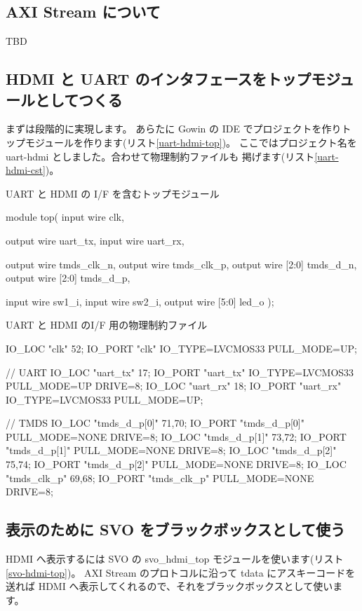 \subsection{AXI Stream について}
TBD

\subsection{HDMI と UART のインタフェースをトップモジュールとしてつくる}
まずは段階的に実現します。
あらたに Gowin の IDE でプロジェクトを作りトップモジュールを作ります(リスト\ref{uart-hdmi-top})。
ここではプロジェクト名を uart-hdmi としました。合わせて物理制約ファイルも
掲げます(リスト\ref{uart-hdmi-cst})。

\begin{table}
\label{uart-hdmi-top}
\caption{UART と HDMI の I/F を含むトップモジュール}
\begin{C++}
module top(
    input wire clk,

    output wire uart_tx,
    input wire uart_rx,

    output wire tmds_clk_n,
    output wire tmds_clk_p,
    output wire [2:0] tmds_d_n,
    output wire [2:0] tmds_d_p,

    input wire sw1_i,
    input wire sw2_i,
    output wire [5:0] led_o
);
\end{C++}
\end{table}

\begin{table}
\label{uart-hdmi-cst}
\caption{UART と HDMI のI/F 用の物理制約ファイル}
\begin{C++}
IO_LOC "clk" 52;
IO_PORT "clk" IO_TYPE=LVCMOS33 PULL_MODE=UP;

// UART
IO_LOC "uart_tx" 17;
IO_PORT "uart_tx" IO_TYPE=LVCMOS33 PULL_MODE=UP DRIVE=8;
IO_LOC "uart_rx" 18;
IO_PORT "uart_rx" IO_TYPE=LVCMOS33 PULL_MODE=UP;

// TMDS
IO_LOC "tmds_d_p[0]" 71,70;
IO_PORT "tmds_d_p[0]" PULL_MODE=NONE DRIVE=8;
IO_LOC "tmds_d_p[1]" 73,72;
IO_PORT "tmds_d_p[1]" PULL_MODE=NONE DRIVE=8;
IO_LOC "tmds_d_p[2]" 75,74;
IO_PORT "tmds_d_p[2]" PULL_MODE=NONE DRIVE=8;
IO_LOC "tmds_clk_p" 69,68;
IO_PORT "tmds_clk_p" PULL_MODE=NONE DRIVE=8;
\end{C++}
\end{table}

\subsection{表示のために SVO をブラックボックスとして使う}
HDMI へ表示するには SVO の svo\_hdmi\_top モジュールを使います(リスト\ref{svo-hdmi-top})。
AXI Stream のプロトコルに沿って tdata にアスキーコードを送れば
HDMI へ表示してくれるので、それをブラックボックスとして使います。


